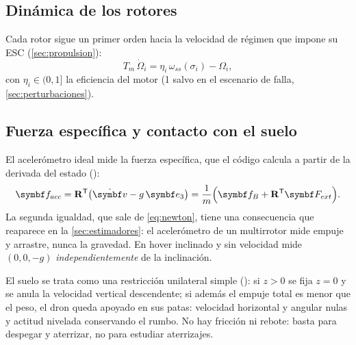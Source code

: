 \subsection{Dinámica de los rotores}

Cada rotor sigue un primer orden hacia la velocidad de régimen que impone su
ESC (\cref{sec:propulsion}):
\begin{equation}
T_m\,\dot\Omega_i = \eta_i\,\omega_{ss}(\sigma_i) - \Omega_i ,
\label{eq:rotor}
\end{equation}
con $\eta_i\in(0,1]$ la eficiencia del motor (1 salvo en el escenario de falla,
\cref{sec:perturbaciones}).

\subsection{Fuerza específica y contacto con el suelo}

El acelerómetro ideal mide la fuerza específica, que el código calcula a
partir de la derivada del estado ():
\begin{equation}
\vect f_{acc} = \R\T\big(\dot{\vect v} - g\,\eu\big)
= \frac{1}{m}\Big(\vect f_B + \R\T\vect F_{ext}\Big).
\label{eq:fesp}
\end{equation}
La segunda igualdad, que sale de \eqref{eq:newton}, tiene una consecuencia
que reaparece en la \cref{sec:estimadores}: el acelerómetro de un
multirrotor mide empuje y arrastre, nunca la gravedad. En hover inclinado y
sin velocidad mide $(0,0,-g)$ \emph{independientemente} de la inclinación.

El suelo se trata como una restricción unilateral simple
(): si $z>0$ se fija $z=0$ y se anula la
velocidad vertical descendente; si además el empuje total es menor que el
peso, el dron queda apoyado en sus patas: velocidad horizontal y angular
nulas y actitud nivelada conservando el rumbo. No hay fricción ni rebote:
basta para despegar y aterrizar, no para estudiar aterrizajes.
